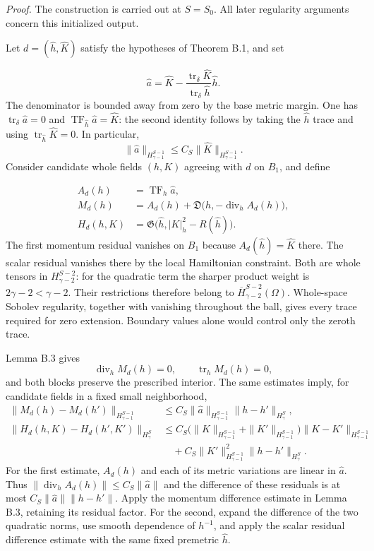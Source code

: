 \documentclass[
  english,
  11pt,
  reqno]{amsart}
\begin{document}
\emph{Proof.} The construction is carried out at \(S=S_0\). All later
regularity arguments concern this initialized output.

Let \(d=(\widehat h,\widehat K)\) satisfy the hypotheses of Theorem B.1,
and set

\label{eq:online-extension-fixed-premomentum} \[
\widehat a=\widehat K-
\frac{\operatorname{tr}_\delta\widehat K}
{\operatorname{tr}_\delta\widehat h}\widehat h.
\] The denominator is bounded away from zero by the base metric margin.
One has \(\operatorname{tr}_\delta \widehat a=0\) and
\(\operatorname{TF}_{\widehat h}\widehat a=\widehat K\): the second
identity follows by taking the \(\widehat h\) trace and using
\(\operatorname{tr}_{\widehat h}\widehat K=0\). In particular, \[
\|\widehat a\|_{H^{S-1}_{\gamma-1}}
\le C_S\|\widehat K\|_{H^{S-1}_{\gamma-1}}.
\] Consider candidate whole fields \((h,K)\) agreeing with \(d\) on
\(B_1\), and define

\label{eq:online-extension-iteration-blocks} \[
\begin{aligned}
A_d(h)&=\operatorname{TF}_h \widehat a,\\
M_d(h)&=A_d(h)+
\mathfrak D\bigl(h,-\operatorname{div}_hA_d(h)\bigr),\\
H_d(h,K)&=\mathfrak G\bigl(
\widehat h,|K|_h^2-R(\widehat h)\bigr).
\end{aligned}
\] The first momentum residual vanishes on \(B_1\) because
\(A_d(\widehat h)=\widehat K\) there. The scalar residual vanishes there
by the local Hamiltonian constraint. Both are whole tensors in
\(H^{S-2}_{\gamma-2}\): for the quadratic term the sharper product
weight is \(2\gamma-2<\gamma-2\). Their restrictions therefore belong to
\(\overline H^{S-2}_{\gamma-2}(\Omega)\). Whole-space Sobolev
regularity, together with vanishing throughout the ball, gives every
trace required for zero extension. Boundary values alone would control
only the zeroth trace.

Lemma B.3 gives \[
\operatorname{div}_hM_d(h)=0,\qquad
\operatorname{tr}_hM_d(h)=0,
\] and both blocks preserve the prescribed interior. The same estimates
imply, for candidate fields in a fixed small neighborhood, \[
\begin{aligned}
\|M_d(h)-M_d(h')\|_{H^{S-1}_{\gamma-1}}
&\le C_S\|\widehat a\|_{H^{S-1}_{\gamma-1}}
\|h-h'\|_{H^S_\gamma},\\
\|H_d(h,K)-H_d(h',K')\|_{H^S_\gamma}
&\le C_S\bigl(\|K\|_{H^{S-1}_{\gamma-1}}+
\|K'\|_{H^{S-1}_{\gamma-1}}\bigr)
\|K-K'\|_{H^{S-1}_{\gamma-1}}\\
&\quad+C_S\|K'\|_{H^{S-1}_{\gamma-1}}^2
\|h-h'\|_{H^S_\gamma}.
\end{aligned}
\] For the first estimate, \(A_d(h)\) and each of its metric variations
are linear in \(\widehat a\). Thus
\(\|\operatorname{div}_hA_d(h)\|\le C_S\|\widehat a\|\) and the
difference of these residuals is at most \(C_S\|\widehat a\|\|h-h'\|\).
Apply the momentum difference estimate in Lemma B.3, retaining its
residual factor. For the second, expand the difference of the two
quadratic norms, use smooth dependence of \(h^{-1}\), and apply the
scalar residual difference estimate with the same fixed premetric
\(\widehat h\).
\end{document}
